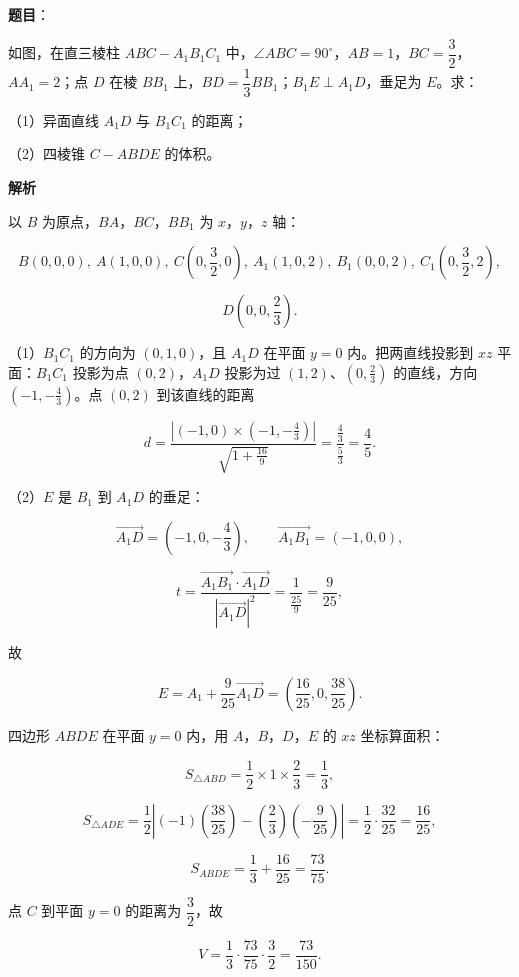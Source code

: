 \begin{answer}

\textbf{题目}：

如图，在直三棱柱 $ABC-A_1B_1C_1$ 中，$\angle ABC=90^\circ$，$AB=1$，$BC=\dfrac32$，$AA_1=2$；点 $D$ 在棱 $BB_1$ 上，$BD=\dfrac13BB_1$；$B_1E\perp A_1D$，垂足为 $E$。求：

（1）异面直线 $A_1D$ 与 $B_1C_1$ 的距离；

（2）四棱锥 $C-ABDE$ 的体积。
\nopagebreak[4]
\begin{center}\end{center}
\nopagebreak[4]
\textbf{解析}

以 $B$ 为原点，$BA$，$BC$，$BB_1$ 为 $x$，$y$，$z$ 轴：

\nopagebreak[4]
\[B(0,0,0),\ A(1,0,0),\ C\left(0,\frac32,0\right),\ A_1(1,0,2),\ B_1(0,0,2),\ C_1\left(0,\frac32,2\right),\]

\nopagebreak[4]
\[D\left(0,0,\frac23\right).\]

（1）$B_1C_1$ 的方向为 $(0,1,0)$，且 $A_1D$ 在平面 $y=0$ 内。把两直线投影到 $xz$ 平面：$B_1C_1$ 投影为点 $(0,2)$，$A_1D$ 投影为过 $(1,2)$、$\left(0,\frac23\right)$ 的直线，方向 $(-1,-\frac43)$。点 $(0,2)$ 到该直线的距离

\nopagebreak[4]
\[d=\frac{\left|(-1,0)\times\left(-1,-\frac43\right)\right|}{\sqrt{1+\frac{16}9}}
=\frac{\frac43}{\frac53}=\frac45.\]

（2）$E$ 是 $B_1$ 到 $A_1D$ 的垂足：

\nopagebreak[4]
\[\overrightarrow{A_1D}=\left(-1,0,-\frac43\right),\qquad \overrightarrow{A_1B_1}=(-1,0,0),\]

\nopagebreak[4]
\[t=\frac{\overrightarrow{A_1B_1}\cdot\overrightarrow{A_1D}}{\left|\overrightarrow{A_1D}\right|^2}
=\frac{1}{\frac{25}9}=\frac9{25},\]

故

\nopagebreak[4]
\[E=A_1+\frac9{25}\overrightarrow{A_1D}=\left(\frac{16}{25},0,\frac{38}{25}\right).\]

四边形 $ABDE$ 在平面 $y=0$ 内，用 $A$，$B$，$D$，$E$ 的 $xz$ 坐标算面积：

\nopagebreak[4]
\[S_{\triangle ABD}=\frac12\times1\times\frac23=\frac13,\]

\nopagebreak[4]
\[S_{\triangle ADE}=\frac12\left|(-1)\left(\frac{38}{25}\right)-\left(\frac23\right)\left(-\frac9{25}\right)\right|
=\frac12\cdot\frac{32}{25}=\frac{16}{25},\]

\nopagebreak[4]
\[S_{ABDE}=\frac13+\frac{16}{25}=\frac{73}{75}.\]

点 $C$ 到平面 $y=0$ 的距离为 $\dfrac32$，故

\nopagebreak[4]
\[V=\frac13\cdot\frac{73}{75}\cdot\frac32=\frac{73}{150}.\]


\end{answer}
